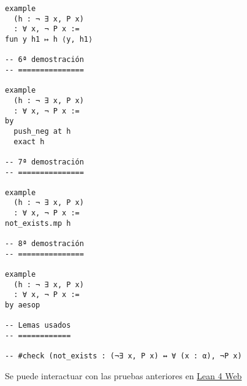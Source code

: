 \begin{verbatim}
example
  (h : ¬ ∃ x, P x)
  : ∀ x, ¬ P x :=
fun y h1 ↦ h ⟨y, h1⟩

-- 6ª demostración
-- ===============

example
  (h : ¬ ∃ x, P x)
  : ∀ x, ¬ P x :=
by
  push_neg at h
  exact h

-- 7ª demostración
-- ===============

example
  (h : ¬ ∃ x, P x)
  : ∀ x, ¬ P x :=
not_exists.mp h

-- 8ª demostración
-- ===============

example
  (h : ¬ ∃ x, P x)
  : ∀ x, ¬ P x :=
by aesop

-- Lemas usados
-- ============

-- #check (not_exists : (¬∃ x, P x) ↔ ∀ (x : α), ¬P x)
\end{verbatim}
Se puede interactuar con las pruebas anteriores en \href{https://lean.math.hhu.de/\#url=https://raw.githubusercontent.com/jaalonso/Calculemus2/main/src/Para\_todo\_no\_de\_no\_existe.lean}{Lean 4 Web}

